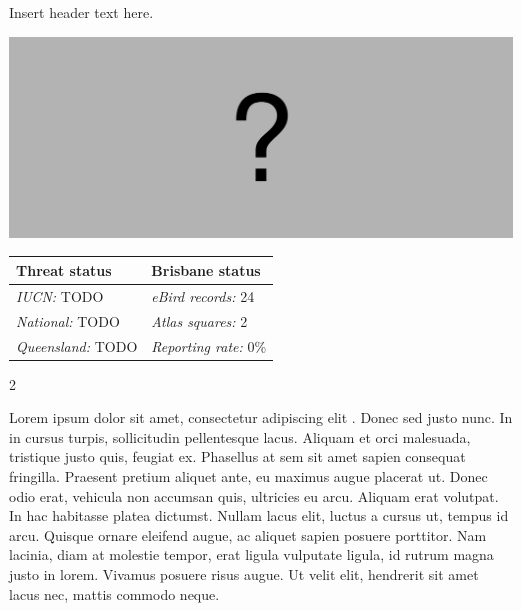 \documentclass[12pt,openany,oneside]{book}
\let\origfigure\figure
\let\endorigfigure\endfigure
\renewenvironment{figure}[1][2] {
  \expandafter\origfigure\expandafter[H]
} {
  \endorigfigure
}
\let\Begin\begin
\let\End\end
\theoremstyle{definition}
\theoremstyle{definition}
\theoremstyle{definition}
\theoremstyle{remark}
\begin{document}

Insert header text here.

\begin{figure}
\centering
\includegraphics[width=\textwidth,keepaspectratio=true]{assets/misc/missing-profile.png}
\caption{Insert caption here.}
\end{figure}

\begin{tabu} to 
\toprule
Threat status & Brisbane status\\
\midrule
\textit{IUCN:} TODO & \textit{eBird records:} 24\\
\textit{National:} TODO & \textit{Atlas squares:} 2\\
\textit{Queensland:} TODO & \textit{Reporting rate:} 0\%\\
\bottomrule
\end{tabu} 
\vspace{0.15cm}

\Begin{multicols}{2}

Lorem ipsum dolor sit amet, consectetur adipiscing elit
\citep{rexample1, rexample2, rexample3}. Donec sed justo nunc. In in
cursus turpis, sollicitudin pellentesque lacus. Aliquam et orci
malesuada, tristique justo quis, feugiat ex. Phasellus at sem sit amet
sapien consequat fringilla. Praesent pretium aliquet ante, eu maximus
augue placerat ut. Donec odio erat, vehicula non accumsan quis,
ultricies eu arcu. Aliquam erat volutpat. In hac habitasse platea
dictumst. Nullam lacus elit, luctus a cursus ut, tempus id arcu. Quisque
ornare eleifend augue, ac aliquet sapien posuere porttitor. Nam lacinia,
diam at molestie tempor, erat ligula vulputate ligula, id rutrum magna
justo in lorem. Vivamus posuere risus augue. Ut velit elit, hendrerit
sit amet lacus nec, mattis commodo neque.

\End{multicols}

\clearpage
\end{document}
